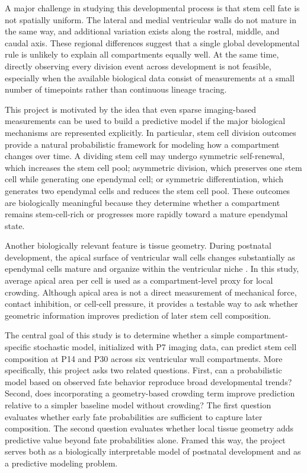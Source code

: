 \documentclass[12pt]{article}
\begin{document}
A major challenge in studying this developmental process is that stem cell fate is not spatially uniform. The lateral and medial ventricular walls do not mature in the same way, and additional variation exists along the rostral, middle, and caudal axis. These regional differences suggest that a single global developmental rule is unlikely to explain all compartments equally well. At the same time, directly observing every division event across development is not feasible, especially when the available biological data consist of measurements at a small number of timepoints rather than continuous lineage tracing.

This project is motivated by the idea that even sparse imaging-based measurements can be used to build a predictive model if the major biological mechanisms are represented explicitly. In particular, stem cell division outcomes provide a natural probabilistic framework for modeling how a compartment changes over time. A dividing stem cell may undergo symmetric self-renewal, which increases the stem cell pool; asymmetric division, which preserves one stem cell while generating one ependymal cell; or symmetric differentiation, which generates two ependymal cells and reduces the stem cell pool. These outcomes are biologically meaningful because they determine whether a compartment remains stem-cell-rich or progresses more rapidly toward a mature ependymal state.

Another biologically relevant feature is tissue geometry. During postnatal development, the apical surface of ventricular wall cells changes substantially as ependymal cells mature and organize within the ventricular niche \citep{Redmond2019}. In this study, average apical area per cell is used as a compartment-level proxy for local crowding. Although apical area is not a direct measurement of mechanical force, contact inhibition, or cell-cell pressure, it provides a testable way to ask whether geometric information improves prediction of later stem cell composition.

The central goal of this study is to determine whether a simple compartment-specific stochastic model, initialized with P7 imaging data, can predict stem cell composition at P14 and P30 across six ventricular wall compartments. More specifically, this project asks two related questions. First, can a probabilistic model based on observed fate behavior reproduce broad developmental trends? Second, does incorporating a geometry-based crowding term improve prediction relative to a simpler baseline model without crowding? The first question evaluates whether early fate probabilities are sufficient to capture later composition. The second question evaluates whether local tissue geometry adds predictive value beyond fate probabilities alone. Framed this way, the project serves both as a biologically interpretable model of postnatal development and as a predictive modeling problem.
\end{document}
